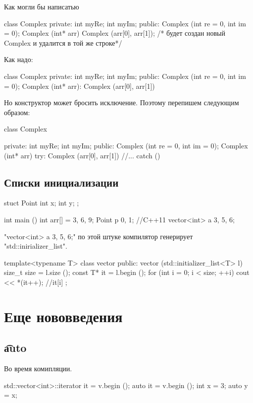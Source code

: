 Как могли бы написатью
\begin{cppcode}
class Complex {
private:
	int myRe;
	int myIm;
public:
	Complex (int re = 0, int im = 0);
	Complex (int* arr) {
		Complex (arr[0], arr[1]);
		/* будет создан новый Complex и удалится в той же строке*/
	}
}
\end{cppcode}

Как надо:
\begin{cppcode}
class Complex {
private:
	int myRe;
	int myIm;
public:
	Complex (int re = 0, int im = 0);
	Complex (int* arr): Complex (arr[0], arr[1]) {}
}
\end{cppcode}
Но конструктор может бросить исключение.
Поэтому перепишем следующим образом:

\begin{cppcode}
class Complex {
private:
	int myRe;
	int myIm;
public:
	Complex (int re = 0, int im = 0);
	Complex (int* arr) try: Complex (arr[0], arr[1]) {
		//...
	}
	catch (){

	}
}
\end{cppcode}

\subsection{Списки инициализации}
\begin{cppcode}
stuct Point {
	int x;
	int y;
};

int main () {
	int arr[] = {3, 6, 9};
	Point p {0, 1};
	//C++11
	vector<int> a {3, 5, 6};
}
\end{cppcode}
\cpp"vector<int> a {3, 5, 6};" по этой штуке компилятор генерирует \cpp"std::inirializer_list".

\begin{cppcode}
template<typename T>
class vector {
public:
	vector (std::initializer_list<T> l) {
		size_t size = l.size ();
		const T* it = l.begin ();
		for (int i = 0; i < size; ++i)
			cout << *(it++); //it[i]
	}
};
\end{cppcode}

\section{Еще нововведения}

\subsection{\t{auto}}

Во время комипляции.
\begin{cppcode}
std::vector<int>::iterator it = v.begin ();
auto it = v.begin ();
int x = 3;
auto y = x;
\end{cppcode}

